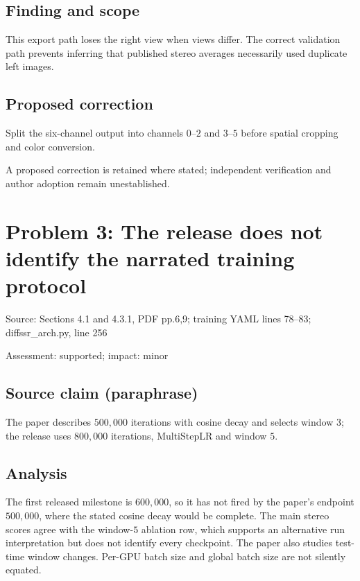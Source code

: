 \documentclass[11pt]{article}
\begin{document}
\subsection*{Finding and scope}

This export path loses the right view when views differ. The correct validation path prevents inferring that published stereo averages necessarily used duplicate left images.

\subsection*{Proposed correction}

Split the six-channel output into channels \(0\)–\(2\) and \(3\)–\(5\) before spatial cropping and color conversion.

A proposed correction is retained where stated; independent verification and author adoption remain unestablished.

\section*{Problem 3: The release does not identify the narrated training protocol}

Source: Sections 4.1 and 4.3.1, PDF pp.6,9; training YAML lines 78–83; diffssr\_arch.py, line 256

Assessment: supported; impact: minor

\subsection*{Source claim (paraphrase)}

The paper describes \(500{,}000\) iterations with cosine decay and selects window \(3\); the release uses \(800{,}000\) iterations, MultiStepLR and window \(5\).

\subsection*{Analysis}

The first released milestone is \(600{,}000\), so it has not fired by the paper’s endpoint \(500{,}000\), where the stated cosine decay would be complete. The main stereo scores agree with the window-\(5\) ablation row, which supports an alternative run interpretation but does not identify every checkpoint. The paper also studies test-time window changes. Per-GPU batch size and global batch size are not silently equated.
\end{document}
